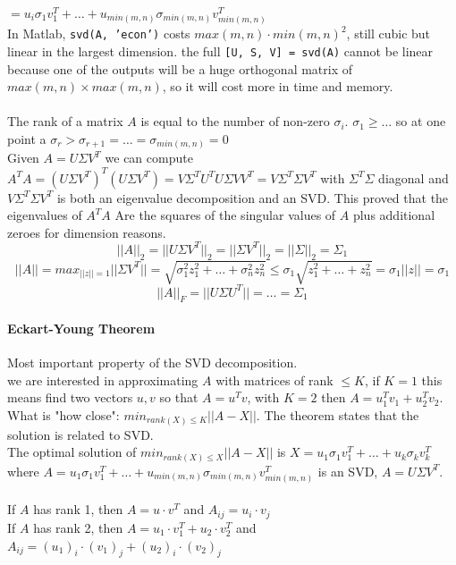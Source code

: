 \documentclass[10pt]{report}
\begin{document}
$= u_i\sigma_1 v_1^T + \ldots + u_{min(m, n)} \sigma_{min(m, n)} v_{min(m, n)}^T$\\
In Matlab, \texttt{svd(A, 'econ')} costs $max(m,n)\cdot min(m,n)^2$, still cubic but linear in the largest dimension. the full \texttt{[U, S, V] = svd(A)} cannot be linear because one of the outputs will be a huge orthogonal matrix of $max(m,n)\times max(m,n)$, so it will cost more in time and memory.\\\\
The rank of a matrix $A$ is equal to the number of non-zero $\sigma_i$. $\sigma_1\geq \ldots$ so at one point a $\sigma_r > \sigma_{r+1} = \ldots = \sigma_{min(m,n)} = 0$\\
Given $A = U\Sigma V^T$ we can compute $A^T A = (U\Sigma V^T)^T(U\Sigma V^T) = V\Sigma^T U^T U \Sigma VV^T = V\Sigma^T \Sigma V^T$ with $\Sigma^T \Sigma$ diagonal and $V\Sigma^T \Sigma V^T$ is both an eigenvalue decomposition and an SVD. This proved that the eigenvalues of $A^T A$ Are the squares of the singular values of $A$ plus additional zeroes for dimension reasons.
$$||A||_2 = ||U\Sigma V^T||_2 = ||\Sigma V^T||_2 = ||\Sigma||_2 = \Sigma_1$$
$$||A|| = max_{||z|| = 1} ||\Sigma V^T|| = \sqrt{\sigma_1^2 z_1^2 + \ldots + \sigma_n^2 z_n^2} \leq \sigma_1 \sqrt{z_1^2 +\ldots + z_n^2} = \sigma_1||z|| = \sigma_1$$
$$||A||_F = ||U\Sigma U^T|| = \ldots = \Sigma_1$$
\paragraph{Eckart-Young Theorem} Most important property of the SVD decomposition.\\
we are interested in approximating $A$ with matrices of rank $\leq K$, if $K = 1$ this means find two vectors $u, v$ so that $A = u^T v$, with $K=2$ then $A = u_1^T v_1 + u_2^T v_2$. What is "how close": $min_{rank(X) \leq K}||A - X||$. The theorem states that the solution is related to SVD.\\
The optimal solution of $min_{rank(X) \leq X}||A - X||$ is $X = u_1\sigma_1 v_1^T + \ldots + u_k\sigma_k v_k^T$ where $A = u_1\sigma_1 v_1^T + \ldots + u_{min(m,n)}\sigma_{min(m,n)} v_{min(m,n)}^T$ is an SVD, $A = U\Sigma V^T$.

\paragraph{} If $A$ has rank 1, then $A = u\cdot v^T$ and $A_{ij} = u_i\cdot v_j$\\
If $A$ has rank 2, then $A= u_1\cdot v_1^T + u_2\cdot v_2^T$ and $A_{ij} = (u_1)_i\cdot (v_1)_j + (u_2)_i\cdot (v_2)_j$
\end{document}

